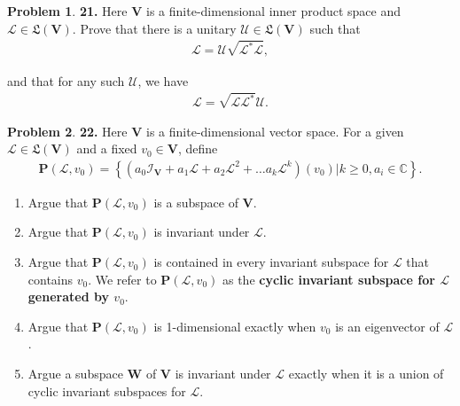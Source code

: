\documentclass{book}
\theoremstyle{definition}
\newtheorem*{prob*}{Problem}
\newcommand{\Uni}{\mathcal{U}}
\newcommand{\V}{\mathbf{V}}
\newcommand{\W}{\mathbf{W}}
\newcommand{\lag}{\mathcal{L}}
\newcommand{\LL}{\mathfrak{L}}
\newcommand{\lp}{\left(}
\newcommand{\rp}{\right)}
\newcommand{\id}{\mathcal{I}}
\begin{document}
\newpage



\begin{prob*}\textbf{21.} Here $\V$ is a finite-dimensional inner product space and $\lag \in \LL(\V)$. Prove that there is a unitary $\Uni \in \LL(\V)$ such that
	\begin{align*}
	\lag = \Uni\sqrt{\lag^*\lag},
	\end{align*}
	
	and that for any such $\Uni$, we have
	\begin{align*}
	\lag = \sqrt{\lag\lag^*} \Uni.
	\end{align*}
	
\end{prob*}




\newpage



\begin{prob*}\textbf{22.} Here $\V$ is a finite-dimensional vector space. For a given $\lag \in \LL(\V)$ and a fixed $v_0 \in \V$, define
	\begin{align*}
	\mathbf{P}(\lag,v_0) = \left\{ \lp a_0 \id_\V + a_1 \lag + a_2 \lag^2 + \dots a_k \lag^k \rp(v_0) \bigg\vert   k \geq 0, a_i \in \mathbb{C}  \right\}.
	\end{align*}
	
	\begin{enumerate}
		\item Argue that $\mathbf{P}(\lag,v_0)$ is a subspace of $\V$.
		\item Argue that $\mathbf{P}(\lag,v_0)$ is invariant under $\lag$.
		\item Argue that $\mathbf{P}(\lag,v_0)$ is contained in every invariant subspace for $\lag$ that contains $v_0$. We refer to $\mathbf{P}(\lag,v_0)$ as the \textbf{cyclic invariant subspace for $\lag$ generated by $v_0$}.
		\item Argue that $\mathbf{P}(\lag,v_0)$ is 1-dimensional exactly when $v_0$ is an eigenvector of $\lag$.
		\item Argue a subspace $\W$ of $\V$ is invariant under $\lag$ exactly when it is a union of cyclic invariant subspaces for $\lag$.
	\end{enumerate}
	
\end{prob*}






\newpage
\end{document}
